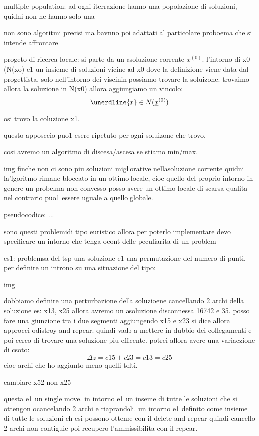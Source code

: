 multiple population: ad ogni iterrazione hanno una popolazione di soluzioni, quidni non ne hanno solo una

non sono algoritmi precisi ma bavnno poi adattati al particolare proboema che si intende affrontare

progeto di ricerca locale: si parte da un asoluzione corrente  $x^{(0)}$. l'intorno di x0 (N(xo) e1 un insieme di soluzioni vicine ad x0 dove la definizione viene data dal progettista. solo nell'intorno dei viscinin possiamo trovare la soluizone. trovaimo allora la soluzione in N(x0) allora aggiungiamo un vincolo:
$$\unerdline{x} \in N(\underline{x}^{(0(})$$

osi trovo la coluzione x1.

questo apposccio puo1 esere ripetuto per ogni soluizone che trovo.

cosi avremo un algoritmo di discesa/ascesa se stiamo min/max.

img finche non ci sono piu soluzioni migliorative nellasoluzione corrente quidni la'lgoritmo rimane bloccato in un ottimo locale, cioe quello del proprio intorno
in genere un probelma non convesso posso avere un ottimo locale di scarsa qualita nel contrario puo1 essere uguale a quello globale.

pseudocodice:
...


sono questi problemidi tipo euristico allora per poterlo implementare devo specificare un intorno che tenga ocont delle peculiarita di un problem

es1: problemsa del tsp
una soluzione e1 una permutazione del numero di punti. per definire un introno su una situazione del tipo:

img

dobbiamo definire una perturbazione della soluzioene cancellando 2 archi della soluzione es: x13, x25 allora avremo un asoluzione disconnessa 16742 e 35. posso fare una giunzione tra i due segmenti aggiungendo x15 e x23 si dice allora approcci odistroy and repear. quindi vado a mettere in dubbio dei collegamenti e poi cerco di trovare una soluzione piu efficente. potrei allora avere una variaczione di csoto: 
$$\Delta z = c15 + c23 = c13 = c25$$
cioe archi che ho aggiunto meno quelli tolti.

cambiare x52 non x25

questa e1 un single move. in intorno e1 un inseme di tutte le soluzioni che si ottengon ocancelando 2 archi e riaprandoli. un intorno e1 definito come insieme di tutte le soluzioni ch esi possono ottenre con il delete and repear quindi cancello 2 archi non contiguie poi recupero l'ammissibilita con il repear.

